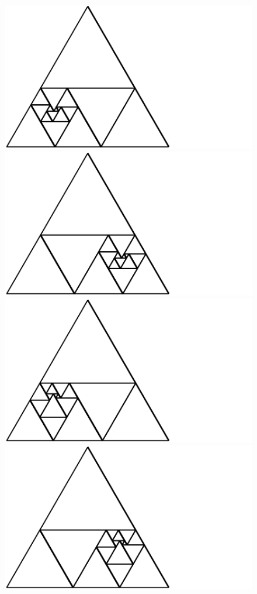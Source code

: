 \documentclass[12pt,amstags,fleqn]{article}
\theoremstyle{plain}
\theoremstyle{definition}
\begin{document}
\begin{figure}[htbp]
\begin{center}
\includegraphics{output-dissections-perfect-dissection17_i442068_r3_c4.pdf}\includegraphics{output-dissections-perfect-dissection17_i442068_r3_c5.pdf}
\includegraphics{output-dissections-perfect-dissection17_i442083_r6_c4.pdf}\includegraphics{output-dissections-perfect-dissection17_i442083_r6_c7.pdf}

\end{center}
\end{figure}
\end{document}
